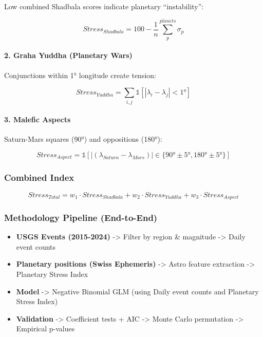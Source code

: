 \documentclass[
  11pt,
  a4paper,
  oneside,
  openany]{article}
\let\oldparagraph\paragraph
\renewcommand{\paragraph}[1]{\oldparagraph{#1}\mbox{}}
\providecommand{\tightlist}{%
  \setlength{\itemsep}{0pt}\setlength{\parskip}{0pt}}\usepackage{longtable,booktabs,array}
\begin{document}
Low combined Shadbala scores indicate planetary ``instability'':

\[
Stress_{Shadbala} = 100 - \frac{1}{n}\sum_{p}^{planets} \sigma_p
\]

\paragraph{2. Graha Yuddha (Planetary
Wars)}\label{graha-yuddha-planetary-wars}

Conjunctions within 1° longitude create tension:

\[
Stress_{Yuddha} = \sum_{i,j} \mathbb{1}[|\lambda_i - \lambda_j| < 1°]
\]

\paragraph{3. Malefic Aspects}\label{malefic-aspects}

Saturn-Mars squares (90°) and oppositions (180°):

\[
Stress_{Aspect} = \mathbb{1}[|(\lambda_{Saturn} - \lambda_{Mars})| \in \{90° \pm 5°, 180° \pm 5°\}]
\]

\subsubsection{Combined Index}\label{combined-index}

\[
Stress_{Total} = w_1 \cdot Stress_{Shadbala} + w_2 \cdot Stress_{Yuddha} + w_3 \cdot Stress_{Aspect}
\]

\subsubsection{Methodology Pipeline
(End-to-End)}\label{methodology-pipeline-end-to-end}

\begin{itemize}
\tightlist
\item
  \textbf{USGS Events (2015-2024)} -\textgreater{} Filter by region \&
  magnitude -\textgreater{} Daily event counts
\item
  \textbf{Planetary positions (Swiss Ephemeris)} -\textgreater{} Astro
  feature extraction -\textgreater{} Planetary Stress Index
\item
  \textbf{Model} -\textgreater{} Negative Binomial GLM (using Daily
  event counts and Planetary Stress Index)
\item
  \textbf{Validation} -\textgreater{} Coefficient tests + AIC
  -\textgreater{} Monte Carlo permutation -\textgreater{} Empirical
  p-values
\end{itemize}
\end{document}
